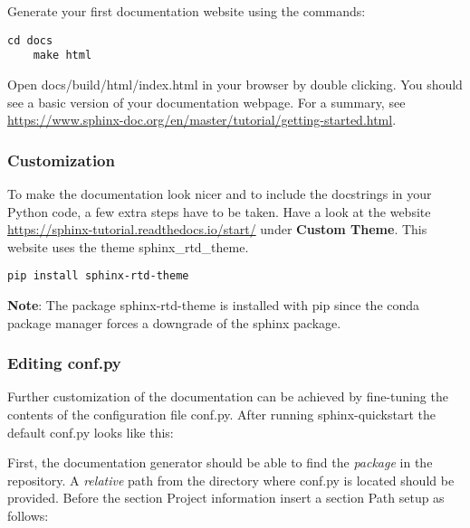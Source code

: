 Generate your first documentation website using the commands:
\begin{lstlisting}[style=DOS]
	cd docs
	make html
\end{lstlisting}

Open \textsf{docs/build/html/index.html} in your browser by double clicking. You should see a basic version of your documentation webpage.
For a summary, see \url{https://www.sphinx-doc.org/en/master/tutorial/getting-started.html}.

\subsubsection{Customization}

To make the documentation look nicer and to include the docstrings in your Python code, a few extra steps have to be taken. Have a look at the website \url{https://sphinx-tutorial.readthedocs.io/start/} under \textbf{Custom Theme}. This website uses the theme \textsf{sphinx\_rtd\_theme}.

\begin{lstlisting}[style=DOS]
	pip install sphinx-rtd-theme
\end{lstlisting}

\textbf{Note}: The package \textsf{sphinx-rtd-theme} is installed with \textsf{pip} since the \textsf{conda package manager} forces a downgrade of the \textsf{sphinx} package.

\subsubsection{Editing conf.py}

Further customization of the documentation can be achieved by fine-tuning the contents of the configuration file \textsf{conf.py}. After running \textsf{sphinx-quickstart} the default \textsf{conf.py} looks like this:



First, the documentation generator should be able to find the \emph{package} in the repository. A \emph{relative} path from the directory where \textsf{conf.py} is located should be provided. Before the section \textsf{Project information} insert a section \textsf{Path setup} as follows:

